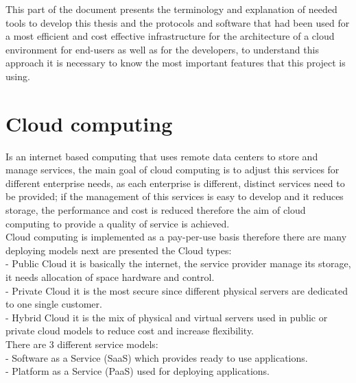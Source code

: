 \label{Scientific research and theoretical background}
 
 
This part of the document presents the terminology and explanation of needed tools to develop this thesis and the protocols and software that had been used for a most efficient and cost effective infrastructure for the architecture of a cloud environment for end-users as well as for the developers, to understand this approach it is necessary to know the most important features that this project is using.\\
 
\section{Cloud computing}
 
Is an internet based computing that uses remote data centers to store and manage services, the main goal of cloud computing is to adjust this services for different enterprise needs, as each enterprise is different, distinct services need to be provided; if the management of this services is easy to develop and it reduces storage, the performance and cost is reduced therefore the aim of cloud computing to provide a quality of service is achieved.\\
 
Cloud computing is implemented as a pay-per-use basis therefore there are many deploying models next are presented the Cloud types:\\
 
- Public Cloud it is basically the internet, the service provider manage its storage, it needs allocation of space hardware and control.\\

- Private Cloud it is the most secure since different physical servers are dedicated to one single customer.\\

- Hybrid Cloud it is the mix of physical and virtual servers used in public or private cloud models to reduce cost and increase flexibility.\\
 
There are 3 different service models:\\
 
- Software as a Service (SaaS) which provides ready to use applications.\\

- Platform as a Service (PaaS) used for deploying applications.\\

